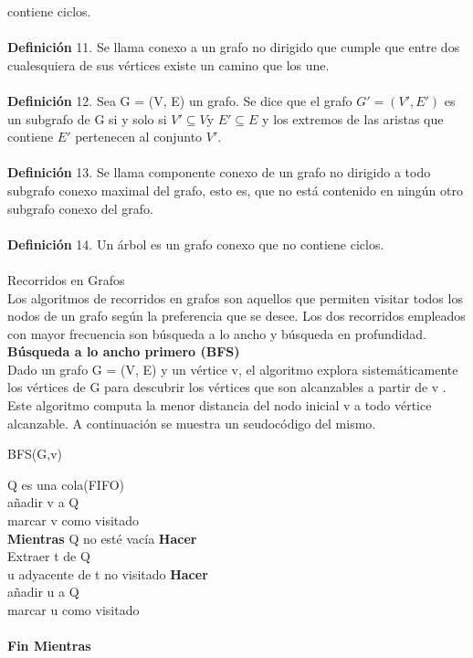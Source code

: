 \documentclass{report}
\begin{document}
contiene ciclos.\\\\
{\bf Definici\'on} 11. Se llama conexo a un grafo no dirigido que cumple que entre dos cualesquiera
de sus v\'ertices existe un camino que los une.\\\\
{\bf Definici\'on} 12. Sea G = (V, E) un grafo. Se dice que el grafo $G' = (V', E')$ es un subgrafo de
G si y solo si $V' \subseteq V $y $E' \subseteq E $ y los extremos de las aristas que contiene $E'$ pertenecen al
conjunto $V'$.\\\\
{\bf Definici\'on} 13. Se llama componente conexo de un grafo no dirigido a todo subgrafo conexo
maximal del grafo, esto es, que no est\'a contenido en ning\'un otro subgrafo conexo del grafo.\\\\
{\bf Definici\'on} 14. Un \'arbol es un grafo conexo que no contiene ciclos.\\\\
{\large Recorridos en Grafos}\\
Los algoritmos de recorridos en grafos son aquellos que permiten visitar todos los nodos de
un grafo seg\'un la preferencia que se desee. Los dos recorridos empleados con mayor frecuencia
son b\'usqueda a lo ancho y b\'usqueda en profundidad.\\
{\bf B\'usqueda a lo ancho primero (BFS)}\\
Dado un grafo G = (V, E) y un v\'ertice v, el algoritmo explora sistem\'aticamente los v\'ertices
de G para descubrir los v\'ertices que son alcanzables a partir de v \cite{Cormen}. Este algoritmo computa
la menor distancia del nodo inicial v a todo v\'ertice alcanzable. A continuaci\'on se muestra un
seudoc\'odigo del mismo.

\begin{algorithm}[H] %
	\caption{BFS(G,v)}\label{ML:Algorithm1}
	\SetAlgoLined
	\LinesNumbered
	\SetAlgoVlined
	Q es una cola(FIFO)\\
	a\~nadir v a Q\\
	marcar v como visitado\\
	{\bf Mientras} Q no est\'e vac\'ia {\bf Hacer}\\
	\hspace{1cm}Extraer t de Q\\
	\hspace{1cm}{\bf Para todo nodo} u adyacente de t no visitado {\bf Hacer}\\
	\hspace{2cm}a\~nadir u a Q\\
	\hspace{2cm}marcar u como visitado\\
	\hspace{1cm}{\bf Fin Para}\\
	{\bf Fin Mientras}\\

\end{algorithm}
\hspace{1cm}\\
\end{document}
